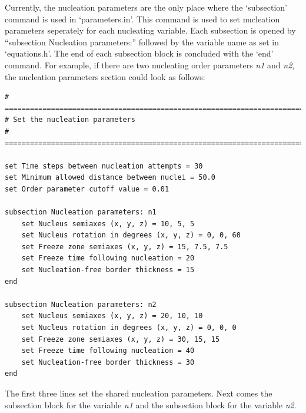 \documentclass[10pt]{article} %
\begin{document}
Currently, the nucleation parameters are the only place where the `subsection' command is used in `parameters.in'.  This command is used to set nucleation parameters seperately for each nucleating variable. Each subsection is opened by ``subsection Nucleation parameters:'' followed by the variable name as set in `equations.h'. The end of each subsection block is concluded with the `end' command. For example, if there are two nucleating order parameters \emph{n1} and \emph{n2}, the nucleation parameters section could look as follows:
\scriptsize
\begin{lstlisting}
# =================================================================================
# Set the nucleation parameters
# =================================================================================

set Time steps between nucleation attempts = 30
set Minimum allowed distance between nuclei = 50.0
set Order parameter cutoff value = 0.01

subsection Nucleation parameters: n1
    set Nucleus semiaxes (x, y, z) = 10, 5, 5
    set Nucleus rotation in degrees (x, y, z) = 0, 0, 60
    set Freeze zone semiaxes (x, y, z) = 15, 7.5, 7.5
    set Freeze time following nucleation = 20
    set Nucleation-free border thickness = 15
end

subsection Nucleation parameters: n2
    set Nucleus semiaxes (x, y, z) = 20, 10, 10
    set Nucleus rotation in degrees (x, y, z) = 0, 0, 0
    set Freeze zone semiaxes (x, y, z) = 30, 15, 15
    set Freeze time following nucleation = 40
    set Nucleation-free border thickness = 30
end
\end{lstlisting}
\normalsize
The first three lines set the shared nucleation parameters. Next comes the subsection block for the variable \emph{n1} and the subsection block for the variable \emph{n2}. 
\end{document}
